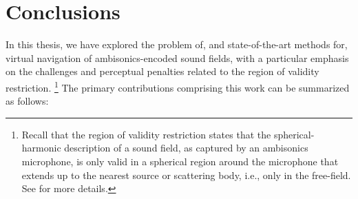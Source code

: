 \chapter{Conclusions}\label{chap:11_Conclusions}

In this thesis, we have explored the problem of, and state-of-the-art methods for, virtual navigation of ambisonics-encoded sound fields, with a particular emphasis on the challenges and perceptual penalties related to the region of validity restriction.%
\footnote{Recall that the region of validity restriction states that the spherical-harmonic description of a sound field, as captured by an ambisonics microphone, is only valid in a spherical region around the microphone that extends up to the nearest source or scattering body, i.e., only in the free-field.
See  for more details.}
The primary contributions comprising this work can be summarized as follows:
